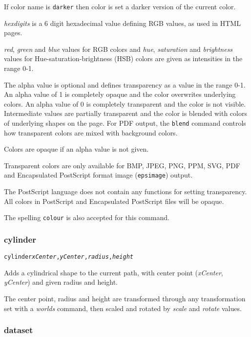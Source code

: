If color name is \texttt{darker} then color is set a darker
version of the current color.

\textit{hexdigits} is a 6 digit hexadecimal
value defining RGB values, as used in HTML pages.

\textit{red}, \textit{green} and \textit{blue} values for RGB colors and
\textit{hue}, \textit{saturation} and \textit{brightness} values for
Hue-saturation-brightness (HSB) colors are given as intensities in the range
0-1.

The alpha value is optional and defines transparency as a value in the range
0-1.  An alpha value of 1 is completely opaque and the color overwrites
underlying colors.  An alpha value of 0 is completely transparent and the color
is not visible.  Intermediate values are partially transparent and the color is
blended with colors of underlying shapes on the page.  For PDF output,
the \texttt{blend} command controls how transparent colors are mixed
with background colors.

Colors are opaque if an alpha value is not given.

Transparent colors are only available for BMP, JPEG, PNG, PPM, SVG, PDF
and Encapsulated PostScript format image (\texttt{epsimage}) output.

The PostScript language does not contain any functions for setting
transparency.
All colors in PostScript and Encapsulated PostScript
files will be opaque.

The spelling \texttt{colour} is also accepted for this command.

\subsubsection{cylinder}

\begin{alltt}
cylinder \textit{xCenter}, \textit{yCenter}, \textit{radius}, \textit{height}
\end{alltt}

Adds a cylindrical shape to the current path, with center
point (\textit{xCenter}, \textit{yCenter}) and given radius and height.

The center point, radius and height are transformed through any
transformation set with a \textit{worlds} command,
then scaled and rotated by \textit{scale}
and \textit{rotate} values.

\subsubsection{dataset}

